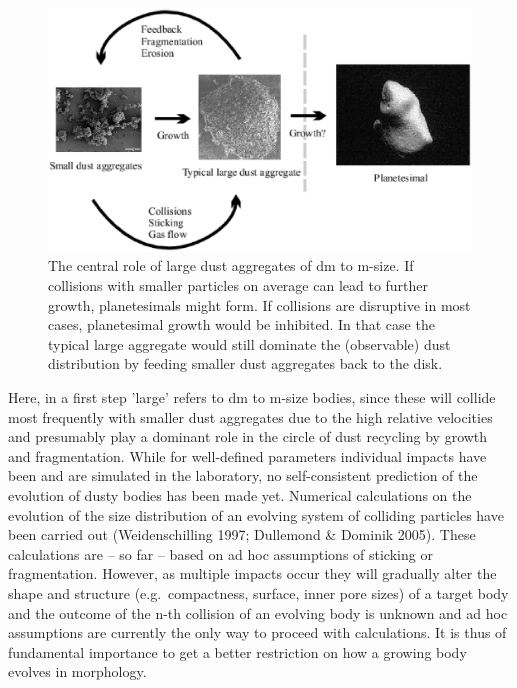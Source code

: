 \begin{figure}
\centerline{\includegraphics[width=15cm]{b2fig1.eps}}
\caption{\label{Schema}The central role of large dust aggregates of 
dm to m-size. If collisions with smaller particles on average can lead to
further growth, planetesimals might form. If collisions are disruptive in
most cases, planetesimal growth would be inhibited. In that case the typical
large aggregate would still dominate the (observable) dust distribution by
feeding smaller dust aggregates back to the disk.}
\end{figure}


Here, in a first step 'large' refers to dm to m-size bodies, since these
will collide most frequently with smaller dust aggregates due to the high
relative velocities and presumably play a dominant role in the circle of
dust recycling by growth and fragmentation. While for well-defined
parameters individual impacts have been and are simulated in the laboratory,
no self-consistent prediction of the evolution of dusty bodies has been made
yet. Numerical calculations on the evolution of the size distribution of an
evolving system of colliding particles have been carried out
(Weidenschilling 1997; Dullemond \& Dominik 2005).  These calculations
are -- so far -- based on ad hoc assumptions of sticking or fragmentation.
However, as multiple impacts occur they will gradually alter the shape and
structure (e.g.~compactness, surface, inner pore sizes) of a target body and
the outcome of the n-th collision of an evolving body is unknown and ad hoc
assumptions are currently the only way to proceed with calculations. It is
thus of fundamental importance to get a better restriction on how a growing
body evolves in morphology.

